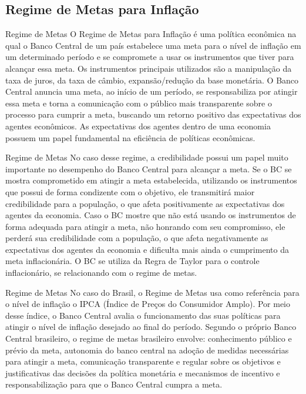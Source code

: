 \documentclass[xcolor=dvipsnames]{beamer}
\begin{document}
\subsection{Regime de Metas para Inflação}
\begin{frame}{Regime de Metas}
O Regime de Metas para Inflação é uma política econômica na qual o Banco Central de um país estabelece uma meta para o nível de inflação em um determinado período e se compromete a usar os instrumentos que tiver para alcançar essa meta. Os instrumentos principais utilizados são a manipulação da taxa de juros, da taxa de câmbio, expansão/redução da base monetária. O Banco Central anuncia uma meta, ao início de um período, se responsabiliza por atingir essa meta e torna a comunicação com o público mais transparente sobre o processo para cumprir a meta, buscando um retorno positivo das expectativas dos agentes econômicos. As expectativas dos agentes dentro de uma economia possuem um papel fundamental na eficiência de políticas econômicas.
    
\end{frame}
\begin{frame}{Regime de Metas}
No caso desse regime, a credibilidade possui um papel muito importante no desempenho do Banco Central para alcançar a meta. Se o BC se mostra comprometido em atingir a meta estabelecida, utilizando os instrumentos que possui de forma condizente com o objetivo, ele transmitirá maior credibilidade para a população, o que afeta positivamente as expectativas dos agentes da economia. Caso o BC mostre que não está usando os instrumentos de forma adequada para atingir a meta, não honrando com seu compromisso, ele perderá sua credibilidade com a população, o que afeta negativamente as expectativas dos agentes da economia e dificulta mais ainda o cumprimento da meta inflacionária. 
O BC se utiliza da Regra de Taylor para o controle inflacionário, se relacionando com o regime de metas.
    
\end{frame}
\begin{frame}{Regime de Metas}
No caso do Brasil, o Regime de Metas usa como referência para o nível de inflação o IPCA (Índice de Preços do Consumidor Amplo). Por meio desse índice, o Banco Central avalia o funcionamento das suas políticas para atingir o nível de inflação desejado ao final do período. Segundo o próprio Banco Central brasileiro, o regime de metas brasileiro envolve: conhecimento público e prévio da meta, autonomia do banco central na adoção de medidas necessárias para atingir a meta, comunicação transparente e regular sobre os objetivos e justificativas das decisões da política monetária e mecanismos de incentivo e responsabilização para que o Banco Central cumpra a meta.
    
\end{frame}
\end{document}
